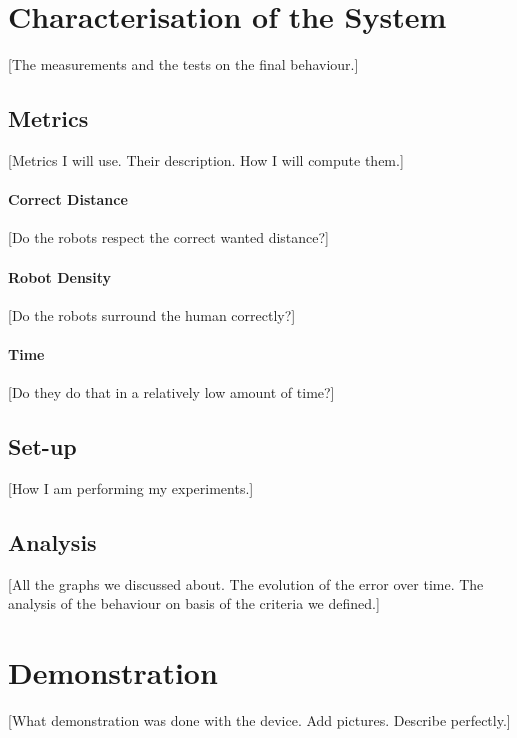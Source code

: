 \documentclass[oneside, a4paper, 12pt]{memoir}
\begin{document}
	\section{Characterisation of the System}
	[The measurements and the tests on the final behaviour.]

		\subsection{Metrics}
		
		[Metrics I will use. Their description. How I will compute them.]
		
			\paragraph{Correct Distance}
			
			[Do the robots respect the correct wanted distance?]
			
			\paragraph{Robot Density}
			
			[Do the robots surround the human correctly?]
			
			\paragraph{Time}
			
			[Do they do that in a relatively low amount of time?]
			
		\subsection{Set-up}
		
		[How I am performing my experiments.]
		
		\subsection{Analysis}
		
		[All the graphs we discussed about. The evolution of the error over time. The analysis of the behaviour on basis of the criteria we defined.]
		
	\section{Demonstration}
	
	[What demonstration was done with the device. Add pictures. Describe perfectly.]
\end{document}
